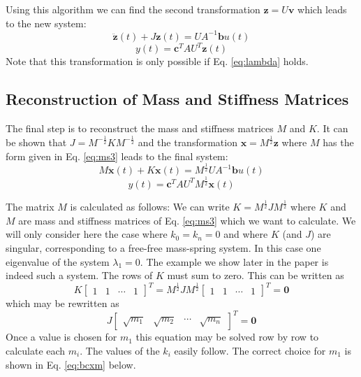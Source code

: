 \documentclass{mbd_fullpaper}
\begin{document}
Using this algorithm we can find the second transformation $\mathbf{z} = U \mathbf{v}$ which leads to the new system:
\begin{equation}
\ddot{\mathbf{z}}(t) + J \mathbf{z}(t) =   U A^{-1} \mathbf{b} u(t)
\label{eq:jacobi1}
\end{equation}
\begin{equation}
y(t) = \mathbf{c}^T  A U^T \mathbf{z}(t)
\label{eq:jacobi2}
\end{equation}
Note that this transformation is only possible if Eq. \ref{eq:lambda} holds.

\subsection{Reconstruction of Mass and Stiffness Matrices}
\label{sec:choiceai}
The final step is to reconstruct the mass and stiffness matrices $M$ and $K$.
It can be shown that $J =  M^{-\frac{1}{2}} K M^{-\frac{1}{2}}$ and the transformation $\mathbf{x} = M^{\frac{1}{2}} \mathbf{z}$ where $M$ has the form given in Eq. \ref{eq:ms3} leads to the final system:
\begin{equation}
M \ddot{\mathbf{x}}(t) + K \mathbf{x}(t) = M^{\frac{1}{2}} U A^{-1} \mathbf{b} u(t)
\label{eq:fin1}
\end{equation}
\begin{equation}
y(t) = \mathbf{c}^T  A U^T M^{\frac{1}{2}}\mathbf{x}(t)
\label{eq:fin2}
\end{equation}

The matrix $M$ is calculated as follows: We can write $K = M^{\frac{1}{2}} J M^{\frac{1}{2}}$ where $K$ and $M$ are mass and stiffness matrices of Eq. \ref{eq:ms3} which we want to calculate.
We will only consider here the case where $k_0 = k_n = 0$ and where $K$ (and $J$) are singular, corresponding to a free-free mass-spring system.
In this case one eigenvalue of the system $\lambda_1 = 0$.
The example we show later in the paper is indeed such a system.
The rows of $K$ must sum to zero. This can be written as
\begin{equation}
K \begin{bmatrix} 1 & 1 & \cdots & 1 \end{bmatrix}^T =  M^{\frac{1}{2}} J M^{\frac{1}{2}} \begin{bmatrix} 1 & 1 & \cdots & 1 \end{bmatrix}^T = \mathbf{0}
\end{equation} 
which may be rewritten as
\begin{equation}
J \begin{bmatrix} \sqrt{m_1} & \sqrt{m_2} & \cdots & \sqrt{m_n} \end{bmatrix}^T = \mathbf{0}
\end{equation}
Once a value is chosen for $m_1$ this equation may be solved row by row to calculate each $m_i$.
The values of the $k_i$ easily follow.
The correct choice for $m_1$ is shown in Eq. \ref{eq:bcxm} below.
\end{document}
